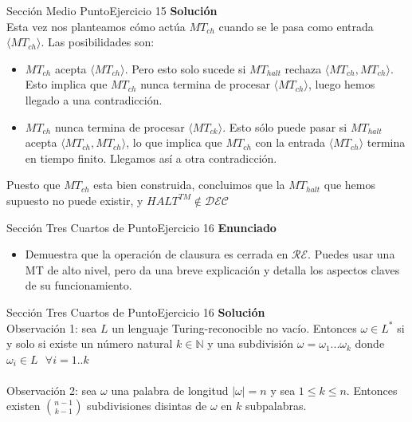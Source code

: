 \documentclass[10pt, envcountsect, presentation, aspectratio=169]{beamer}
\newcommand{\lr}{\ensuremath{\mathcal {RE}}}
\begin{document}

\begin{frame}{Sección Medio Punto}{Ejercicio 15}
    \textbf{Solución}\\
    Esta vez nos planteamos cómo actúa $MT_{ch}$ cuando se le pasa como entrada $\langle MT_{ch}\rangle$. Las posibilidades son:
    \begin{itemize}
        \item $MT_{ch}$ acepta $\langle MT_{ch}\rangle$. Pero esto solo sucede si $MT_{halt}$ rechaza $\langle MT_{ch}, MT_{ch}\rangle$. Esto implica que $MT_{ch}$ nunca termina de procesar $\langle MT_{ch}\rangle$, luego hemos llegado a una contradicción.
        \item $MT_{ch}$ nunca termina de procesar $\langle MT_{ck}\rangle$. Esto sólo puede pasar si $MT_{halt}$ acepta $\langle MT_{ch}, MT_{ch}\rangle$, lo que implica que $MT_{ch}$ con la entrada $\langle MT_{ch}\rangle$ termina en tiempo finito. Llegamos así a otra contradicción.
    \end{itemize}
    Puesto que $MT_{ch}$ esta bien construida, concluimos que la $MT_{halt}$ que hemos supuesto no puede existir, y $HALT^{TM}\notin\mathcal{DEC}$
\end{frame}


\begin{frame}{Sección Tres Cuartos de Punto}{Ejercicio 16}
    \textbf{Enunciado}
    \begin{itemize}
        \item Demuestra que la operación de clausura es cerrada en $\lr$. Puedes usar una MT de alto nivel, pero da una breve explicación y detalla los aspectos claves de su funcionamiento.
    \end{itemize}
\end{frame}


\begin{frame}{Sección Tres Cuartos de Punto}{Ejercicio 16}
    \textbf{Solución}\\
    Observación 1: sea $L$ un lenguaje Turing-reconocible no vacío. 
    Entonces $\omega \in L^*$ si y solo si existe un número natural $k \in \mathbb{N}$ y una subdivisión $\omega = \omega_1...\omega_k$ donde $\omega_i \in L \text{ } \forall i = 1..k$\\~\\

    Observación 2: sea $\omega$ una palabra de longitud $|\omega|=n$ y sea $1 \leq k \leq n$.
    Entonces existen ${n-1}\choose{k-1}$ subdivisiones disintas de $\omega$ en $k$ subpalabras.
\end{frame}
\end{document}
